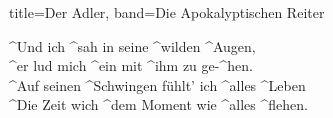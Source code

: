 \begin{song}{title=Der Adler, band=Die Apokalyptischen Reiter}
    \begin{chorus}
        ^Und ich ^sah in seine ^wilden ^Augen, \\
        ^er lud mich ^ein mit ^ihm zu ge-^hen. \\
        ^Auf seinen ^Schwingen fühlt' ich ^alles ^Leben \\
        ^Die Zeit wich ^dem Moment wie ^alles ^flehen. \\
    \end{chorus}
\end{song}